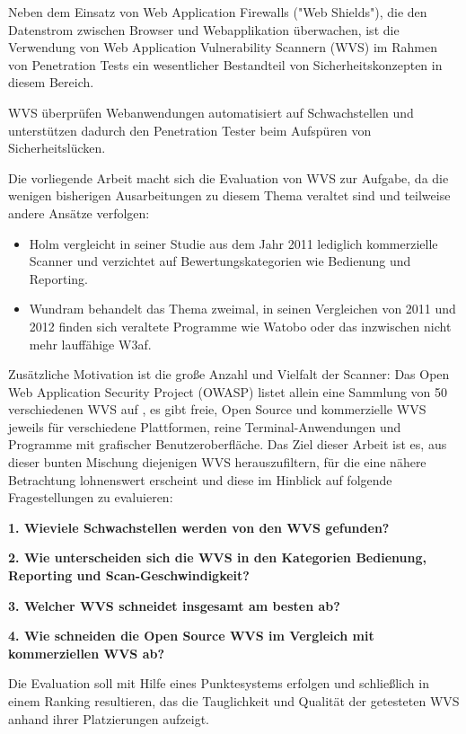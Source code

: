 \documentclass[12pt,oneside,a4paper,parskip,pointlessnumbers]{scrbook}
\begin{document}
Neben dem Einsatz von Web Application Firewalls ("Web Shields"), die den Datenstrom zwischen Browser und Webapplikation überwachen, ist die Verwendung von Web Application Vulnerability Scannern (WVS) im Rahmen von Penetration Tests ein wesentlicher Bestandteil von Sicherheitskonzepten in diesem Bereich.

WVS überprüfen Webanwendungen automatisiert auf Schwachstellen und unterstützen dadurch den Penetration Tester beim Aufspüren von Sicherheitslücken.

Die vorliegende Arbeit macht sich die Evaluation von WVS zur Aufgabe, da die wenigen bisherigen Ausarbeitungen zu diesem Thema veraltet sind und teilweise andere Ansätze verfolgen:

\begin{itemize}
  \item
  Holm \cite{Holm} vergleicht in seiner Studie aus dem Jahr 2011 lediglich kommerzielle Scanner und verzichtet auf Bewertungskategorien wie Bedienung und Reporting.
  \item
  Wundram \cite{Wundram}\cite{Wundram2} behandelt das Thema zweimal, in seinen Vergleichen von 2011 und 2012 finden sich veraltete Programme wie Watobo oder das inzwischen nicht mehr lauffähige W3af.
\end{itemize}

Zusätzliche Motivation ist die große Anzahl und Vielfalt der Scanner: Das Open Web Application Security Project (OWASP) listet allein eine Sammlung von 50 verschiedenen WVS auf \cite{OWASPtools}, es gibt freie, Open Source und kommerzielle WVS jeweils für verschiedene Plattformen, reine Terminal-Anwendungen und Programme mit grafischer Benutzeroberfläche.
Das Ziel dieser Arbeit ist es, aus dieser bunten Mischung diejenigen WVS herauszufiltern, für die eine nähere Betrachtung lohnenswert erscheint und diese im Hinblick auf folgende Fragestellungen zu evaluieren:

\textbf{1. Wieviele Schwachstellen werden von den WVS gefunden?}

\textbf{2. Wie unterscheiden sich die WVS in den Kategorien Bedienung, Reporting und Scan-Geschwindigkeit?}

\textbf{3. Welcher WVS schneidet insgesamt am besten ab?}
\newpage

\textbf{4. Wie schneiden die Open Source WVS im Vergleich mit kommerziellen WVS ab?}

Die Evaluation soll mit Hilfe eines Punktesystems erfolgen und schließlich in einem Ranking resultieren, das die Tauglichkeit und Qualität der getesteten WVS anhand ihrer Platzierungen aufzeigt.
\end{document}
